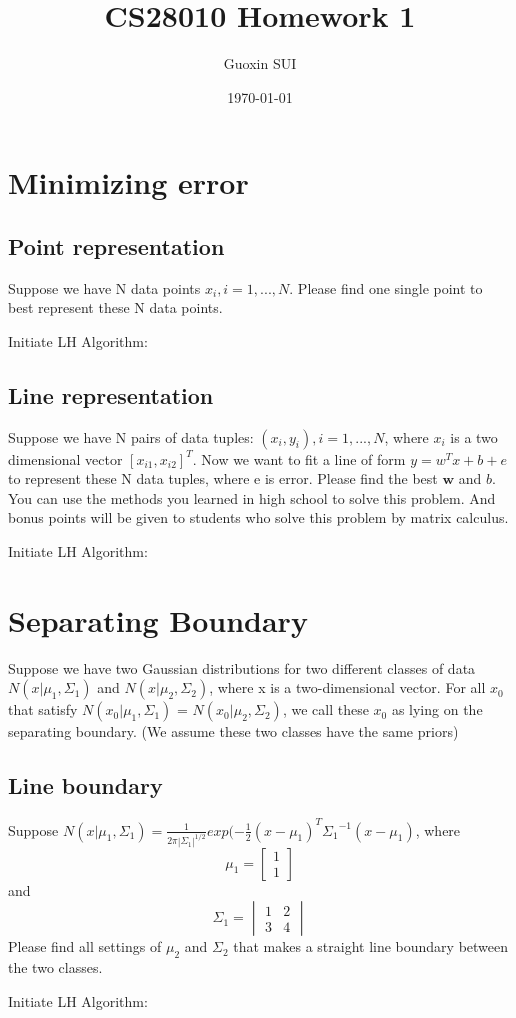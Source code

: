 \documentclass{article}
\title{CS28010 Homework 1}
\author{Guoxin SUI}
\date{\today}
\newenvironment{answer}{\par\color{ForestGreen}}{\par}
\begin{document}
\maketitle

\section{Minimizing error}
\subsection{Point representation}
Suppose we have N data points $x_i, i = 1,... , N$. Please find one single point to best represent these N data points.
\begin{answer}
    Initiate LH Algorithm:
\end{answer}

\subsection{Line representation}
 Suppose we have N pairs of data tuples: $(x_i, y_i), i = 1, ..., N$, where $x_i$ is a two dimensional vector $[x_{i1}, x_{i2}]^T$. Now we want to fit a line of form $y = w^T x + b + e$ to represent these N
data tuples, where e is error. Please find the best $\textbf{w}$ and $b$. You can use the methods you
learned in high school to solve this problem. And bonus points will be given to students
who solve this problem by matrix calculus.

\begin{answer}
    Initiate LH Algorithm:
\end{answer}

\section{Separating Boundary}
Suppose we have two Gaussian distributions for two different classes of data $N(x|\mu_1, \Sigma_1)$
and $N(x|\mu_2, \Sigma_2)$, where x is a two-dimensional vector. For all $x_0$ that satisfy $N(x_0|\mu_1, \Sigma_1)$ =
$N(x_0|\mu_2, \Sigma_2)$, we call these $x_0$ as lying on the separating boundary. (We assume these
two classes have the same priors)

\subsection{Line boundary}
Suppose $N(x|\mu_1, \Sigma_1) = \frac{1}{{2\pi|\Sigma_1|}^{1/2}}exp{(-\frac{1}{2} (x - \mu_1)^T{\Sigma_1}^{-1}(x - \mu_1)}$, where
$$\mu_1 = \begin{bmatrix}1 \\ 1\end{bmatrix} $$
and $$\Sigma_1 = \begin{vmatrix}1 & 2 \\ 3 &4\end{vmatrix} $$
Please find all settings of $\mu_2$ and $\Sigma_2$ that makes a straight line boundary between the two classes.
\begin{answer}
    Initiate LH Algorithm:
\end{answer}
\end{document}
